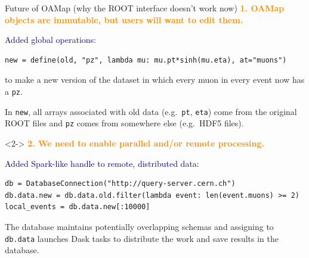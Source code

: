 \documentclass[aspectratio=169]{beamer}
\begin{document}
\begin{frame}[fragile]{Future of OAMap (why the ROOT interface doesn't work now)}
\vspace{0.4 cm}\small
\textcolor{darkorange}{\normalsize\bf 1. OAMap objects are immutable, but users will want to edit them.}

\vspace{0.3 cm}
\textcolor{darkblue}{\normalsize Added global operations:}
\begin{verbatim}
new = define(old, "pz", lambda mu: mu.pt*sinh(mu.eta), at="muons")
\end{verbatim}
to make a new version of the dataset in which every muon in every event now has a {\tt\small pz}.

\vspace{0.1 cm}
In {\tt\small new}, all arrays associated with old data (e.g.\ {\tt\small pt}, {\tt\small eta}) come from the original ROOT files and {\tt\small pz} comes from somewhere else (e.g.\ HDF5 files).

\vspace{0.4 cm}
\begin{uncoverenv}<2->
\textcolor{darkorange}{\normalsize\bf 2. We need to enable parallel and/or remote processing.}

\vspace{0.3 cm}
\textcolor{darkblue}{\normalsize Added Spark-like handle to remote, distributed data:}
\begin{verbatim}
db = DatabaseConnection("http://query-server.cern.ch")
db.data.new = db.data.old.filter(lambda event: len(event.muons) >= 2)
local_events = db.data.new[:10000]
\end{verbatim}

\vspace{0.1 cm}
The database maintains potentially overlapping schemas and assigning to {\tt\small db.data} launches Dask tasks to distribute the work and save results in the database.
\end{uncoverenv}
\end{frame}
\end{document}
